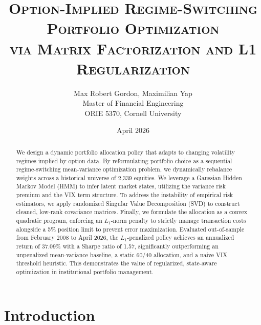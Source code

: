 \documentclass[12pt]{article}
\title{\textsc{Option-Implied Regime-Switching Portfolio Optimization \\ via Matrix Factorization and L1 Regularization}}
\author{Max Robert Gordon, Maximilian Yap \\ Master of Financial Engineering \\ ORIE 5370, Cornell University}
\date{April 2026}
\begin{document}
\maketitle

\begin{abstract}
\noindent We design a dynamic portfolio allocation policy that adapts to changing volatility regimes implied by option data. By reformulating portfolio choice as a sequential regime-switching mean-variance optimization problem, we dynamically rebalance weights across a historical universe of 2,339 equities. We leverage a Gaussian Hidden Markov Model (HMM) to infer latent market states, utilizing the variance risk premium and the VIX term structure. To address the instability of empirical risk estimators, we apply randomized Singular Value Decomposition (SVD) to construct cleaned, low-rank covariance matrices. Finally, we formulate the allocation as a convex quadratic program, enforcing an $L_1$-norm penalty to strictly manage transaction costs alongside a 5\% position limit to prevent error maximization. Evaluated out-of-sample from February 2008 to April 2026, the $L_1$-penalized policy achieves an annualized return of 37.09\% with a Sharpe ratio of 1.57, significantly outperforming an unpenalized mean-variance baseline, a static 60/40 allocation, and a naive VIX threshold heuristic. This demonstrates the value of regularized, state-aware optimization in institutional portfolio management.
\end{abstract}

\newpage
\tableofcontents
\newpage

\section{Introduction}

\end{document}
